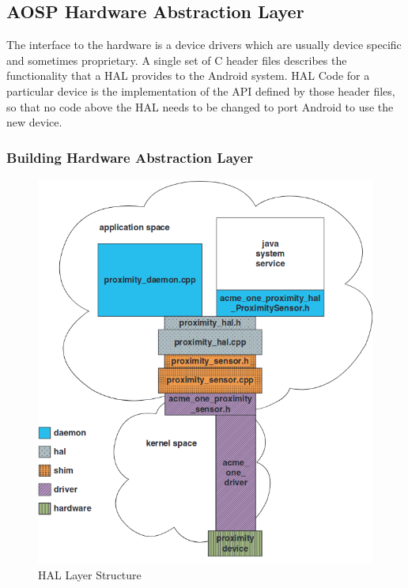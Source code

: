 \subsection{AOSP Hardware Abstraction Layer}
\label{task:20231117_aosp_hal}

The interface to the hardware is a device drivers which are usually device specific and sometimes proprietary. A single set of C header files describes the functionality that a HAL provides to the Android system. HAL Code for a particular device is the implementation of the API defined by those header files, so that no code above the HAL needs to be changed to port Android to use the new device.

\subsubsection*{Building Hardware Abstraction Layer}

\begin{figure}[H]
    \centering
    \includegraphics[width=.75\linewidth]{entries/2023/11/17/hal.png}
    \caption{HAL Layer Structure}
    \label{fig:hallayerstruct}
\end{figure}

